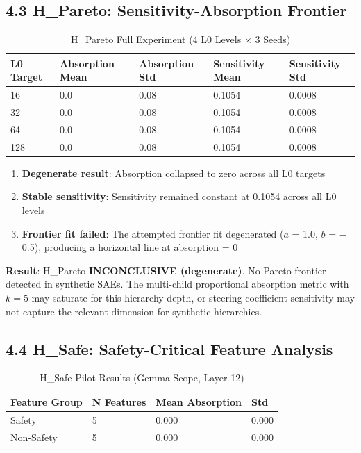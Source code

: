 \documentclass{article}
\begin{document}
\subsection{4.3 H\_Pareto: Sensitivity-Absorption Frontier}

\begin{table}[h]
\centering
\caption{H\_Pareto Full Experiment (4 L0 Levels $\times$ 3 Seeds)}
\label{tab:h_pareto_results}
\begin{tabular}{lllll}
\toprule
L0 Target & Absorption Mean & Absorption Std & Sensitivity Mean & Sensitivity Std \\
\midrule
16 & 0.0 & 0.08 & 0.1054 & 0.0008 \\
32 & 0.0 & 0.08 & 0.1054 & 0.0008 \\
64 & 0.0 & 0.08 & 0.1054 & 0.0008 \\
128 & 0.0 & 0.08 & 0.1054 & 0.0008 \\
\bottomrule
\end{tabular}
\end{table}

\begin{enumerate}
\item \textbf{Degenerate result}: Absorption collapsed to zero across all L0 targets
\item \textbf{Stable sensitivity}: Sensitivity remained constant at 0.1054 across all L0 levels
\item \textbf{Frontier fit failed}: The attempted frontier fit degenerated ($a$ = 1.0, $b$ = $-$0.5), producing a horizontal line at absorption = 0
\end{enumerate}

\textbf{Result}: H\_Pareto \textbf{INCONCLUSIVE (degenerate)}. No Pareto frontier detected in synthetic SAEs. The multi-child proportional absorption metric with $k=5$ may saturate for this hierarchy depth, or steering coefficient sensitivity may not capture the relevant dimension for synthetic hierarchies.

\subsection{4.4 H\_Safe: Safety-Critical Feature Analysis}

\begin{table}[h]
\centering
\caption{H\_Safe Pilot Results (Gemma Scope, Layer 12)}
\label{tab:h_safe_results}
\begin{tabular}{llll}
\toprule
Feature Group & N Features & Mean Absorption & Std \\
\midrule
Safety & 5 & 0.000 & 0.000 \\
Non-Safety & 5 & 0.000 & 0.000 \\
\bottomrule
\end{tabular}
\end{table}
\end{document}
